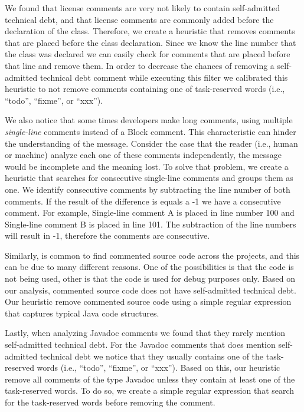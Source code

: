 We found that license comments are very not likely to contain self-admitted technical debt, and that license comments are commonly added before the declaration of the class. Therefore, we create a heuristic that removes comments that are placed before the class declaration. Since we know the line number that the class was declared we can easily check for comments that are placed before that line and remove them. In order to decrease the chances of removing a self-admitted technical debt comment while executing this filter we calibrated this heuristic to not remove comments containing one of task-reserved words (i.e., ``todo'', ``fixme'', or ``xxx'').

We also notice that some times developers make long comments, using multiple \emph{single-line} comments instead of a Block comment. This characteristic can hinder the understanding of the message. Consider the case that the reader (i.e., human or machine) analyze each one of these comments independently, the message would be incomplete and the meaning lost. To solve that problem, we create a heuristic that searches for consecutive single-line comments and groups them as one. We identify consecutive comments by subtracting the line number of both comments. If the result of the difference is equals a -1 we have a consecutive comment. For example, Single-line comment A is placed in line number 100 and Single-line comment B is placed in line 101. The subtraction of the line numbers will result in -1, therefore the comments are consecutive.
 
Similarly, is common to find commented source code across the projects, and this can be due to many different reasons. One of the possibilities is that the code is not being used, other is that the code is used for debug purposes only. Based on our analysis, commented source code does not have self-admitted technical debt. Our heuristic remove commented source code using a simple regular expression that captures typical Java code structures.

Lastly, when analyzing Javadoc comments we found that they rarely mention self-admitted technical debt. For the Javadoc comments that does mention self-admitted technical debt we notice that they usually contains one of the task-reserved words (i.e., ``todo'', ``fixme'', or ``xxx''). Based on this, our heuristic remove all comments of the type Javadoc unless they contain at least one of the task-reserved words. To do so, we create a simple regular expression that search for the task-reserved words before removing the comment.  


